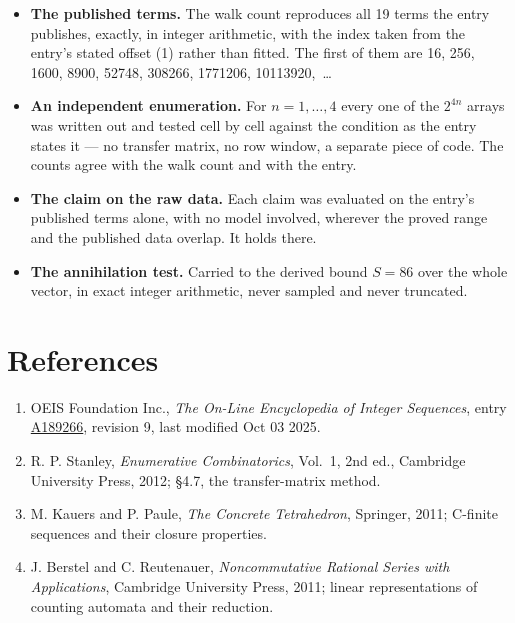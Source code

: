 \documentclass[11pt]{article}
\theoremstyle{definition}
\begin{document}
\begin{itemize}

\item {\bfseries The published terms.} The walk count reproduces all 19 terms the entry publishes, exactly, in integer arithmetic, with the index taken from the entry's stated offset (1) rather than fitted. The first of them are 16, 256, 1600, 8900, 52748, 308266, 1771206, 10113920,~\dots

\item {\bfseries An independent enumeration.} For $n = 1,\dots,4$ every one of the $2^{4n}$ arrays was written out and tested cell by cell against the condition as the entry states it --- no transfer matrix, no row window, a separate piece of code. The counts agree with the walk count and with the entry.

\item {\bfseries The claim on the raw data.} Each claim was evaluated on the entry's published terms alone, with no model involved, wherever the proved range and the published data overlap. It holds there.

\item {\bfseries The annihilation test.} Carried to the derived bound $S = 86$ over the whole vector, in exact integer arithmetic, never sampled and never truncated.

\end{itemize}

\section{References}

\begin{enumerate}

\item OEIS Foundation Inc., \emph{The On-Line Encyclopedia of Integer Sequences}, entry \href{https://oeis.org/A189266}{A189266}, revision 9, last modified Oct 03 2025.

\item R. P. Stanley, \emph{Enumerative Combinatorics}, Vol.~1, 2nd ed., Cambridge University Press, 2012; \S4.7, the transfer-matrix method.

\item M. Kauers and P. Paule, \emph{The Concrete Tetrahedron}, Springer, 2011; C-finite sequences and their closure properties.

\item J. Berstel and C. Reutenauer, \emph{Noncommutative Rational Series with Applications}, Cambridge University Press, 2011; linear representations of counting automata and their reduction.

\end{enumerate}
\end{document}
